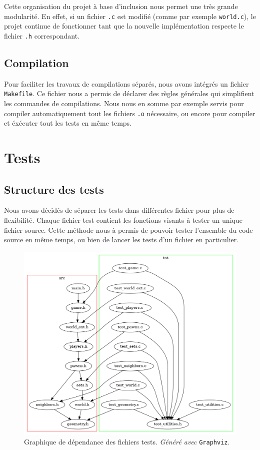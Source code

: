         Cette organisation du projet à base d'inclusion nous permet une très grande modularité. En effet, si un fichier \texttt{.c} est modifié (comme par exemple \texttt{world.c}), le projet continue de fonctionner tant que la nouvelle implémentation respecte le fichier \texttt{.h} correspondant.

    \subsection{Compilation}
        Pour faciliter les travaux de compilations séparés, nous avons intégrés un fichier \texttt{Makefile}. Ce fichier nous a permis de déclarer des règles générales qui simplifient les commandes de compilations. Nous nous en somme par exemple servis pour compiler automatiquement tout les fichiers \texttt{.o} nécessaire, ou encore pour compiler et éxécuter tout les tests en même temps.

\section{Tests}
    \subsection{Structure des tests}
        Nous avons décidés de séparer les tests dans différentes fichier pour plus de flexibilité. Chaque fichier test contient les fonctions visants à tester un unique fichier source. Cette méthode nous à permis de pouvoir tester l'ensemble du code source en même temps, ou bien de lancer les tests d'un fichier en particulier. \\

        \begin{figure}[H]
            \centering
            \includegraphics[scale=0.4]{img/graph_tst.png}
            \caption{Graphique de dépendance des fichiers tests. \textit{Généré avec} \texttt{Graphviz}.}
            \label{fig:graph_tst}
        \end{figure}

